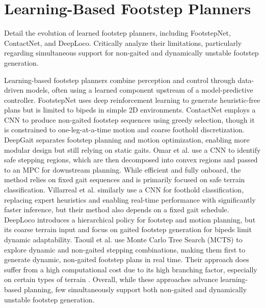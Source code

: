 \section{Learning-Based Footstep Planners}

\begin{outline}
  Detail the evolution of learned footstep planners, including FootstepNet, ContactNet, and DeepLoco. Critically analyze their limitations, particularly regarding simultaneous support for non-gaited and dynamically unstable footstep generation.
\end{outline}

Learning-based footstep planners combine perception and control through data-driven models, often using a learned component upstream of a model-predictive controller. FootstepNet \cite{gaspard_footstepnet_2024} uses deep reinforcement learning to generate heuristic-free plans but is limited to bipeds in simple 2D environments. ContactNet \cite{bratta_contactnet_2024} employs a CNN to produce non-gaited footstep sequences using greedy selection, though it is constrained to one-leg-at-a-time motion and coarse foothold discretization. DeepGait \cite{tsounis_deepgait_2020} separates footstep planning and motion optimization, enabling more modular design but still relying on static gaits. Omar et al. \cite{omar_fast_2022} use a CNN to identify safe stepping regions, which are then decomposed into convex regions and passed to an MPC for downstream planning. While efficient and fully onboard, the method relies on fixed gait sequences and is primarily focused on safe terrain classification. Villarreal et al. \cite{villarreal_fast_2019} similarly use a CNN for foothold classification, replacing expert heuristics and enabling real-time performance with significantly faster inference, but their method also depends on a fixed gait schedule. DeepLoco \cite{peng_deeploco_2017} introduces a hierarchical policy for footstep and motion planning, but its coarse terrain input and focus on gaited footstep generation for bipeds limit dynamic adaptability. Taouil et al. \cite{taouil_non-gaited_2025} use Monte Carlo Tree Search (MCTS) to explore dynamic and non-gaited stepping combinations, making them first to generate dynamic, non-gaited footstep plans in real time. Their approach does suffer from a high computational cost due to its high branching factor, especially on certain types of terrain \cite{bratta_contactnet_2024}. Overall, while these approaches advance learning-based planning, few simultaneously support both non-gaited and dynamically unstable footstep generation.
